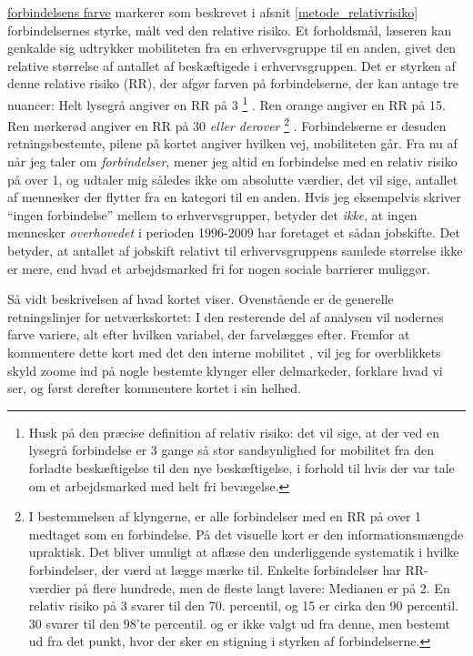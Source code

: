 \underline{forbindelsens farve} markerer som beskrevet i afsnit \ref{metode_relativrisiko} forbindelsernes styrke, målt ved den relative risiko. Et forholdsmål, læseren kan genkalde sig udtrykker mobiliteten fra en erhvervsgruppe til en anden, givet den relative størrelse af antallet af beskæftigede i erhvervsgruppen. Det er styrken af denne relative risiko (RR), der afgør farven på forbindelserne, der kan antage tre nuancer: Helt lysegrå angiver en RR på 3%
%
\footnote{Husk på den præcise definition af relativ risiko:  det vil sige, at der ved en lysegrå forbindelse er 3 gange så stor sandsynlighed for mobilitet fra den forladte beskæftigelse til den nye beskæftigelse, i forhold til hvis der var tale om et arbejdsmarked med helt fri bevægelse.}%
%
. Ren orange angiver en RR på 15. Ren mørkerød angiver en RR på 30 \emph{ eller derover}%
%
\footnote{ I bestemmelsen af klyngerne, er alle forbindelser med en RR på over 1 medtaget som en forbindelse. På det visuelle kort er den informationsmængde upraktisk. Det bliver umuligt at aflæse den underliggende systematik i hvilke forbindelser, der værd at lægge mærke til. Enkelte forbindelser har RR-værdier på flere hundrede, men de fleste langt lavere: Medianen er på 2. 
En relativ risiko på 3 svarer til den 70. percentil, og 15 er cirka den 90 percentil. 30 svarer til den 98'te percentil.  og er ikke valgt ud fra denne, men bestemt ud fra det punkt, hvor der sker en stigning i styrken af forbindelserne. 
}%
%
. Forbindelserne er desuden retningsbestemte, pilene på kortet angiver hvilken vej, mobiliteten går. Fra nu af når jeg taler om \emph{forbindelser}, mener jeg altid en forbindelse med en relativ risiko på over 1, og udtaler mig således ikke om absolutte værdier, det vil sige, antallet af mennesker der flytter fra en kategori til en anden. Hvis jeg eksempelvis skriver “ingen forbindelse” mellem to erhvervsgrupper, betyder det \emph{ikke}, at ingen mennesker \emph{overhovedet} i perioden 1996-2009 har foretaget et sådan jobskifte. Det betyder, at antallet af jobskift relativt til erhvervsgruppens samlede størrelse ikke er mere, end hvad et arbejdsmarked fri for nogen sociale barrierer muliggør. 

Så vidt beskrivelsen af hvad kortet viser. Ovenstående er de generelle retningslinjer for netværkskortet: I den resterende del af analysen vil nodernes farve variere, alt efter hvilken variabel, der farvelægges efter. Fremfor at kommentere dette kort med det den interne mobilitet , vil jeg for overblikkets skyld zoome ind på nogle bestemte klynger eller delmarkeder, forklare hvad vi ser, og først derefter kommentere kortet i sin helhed.


